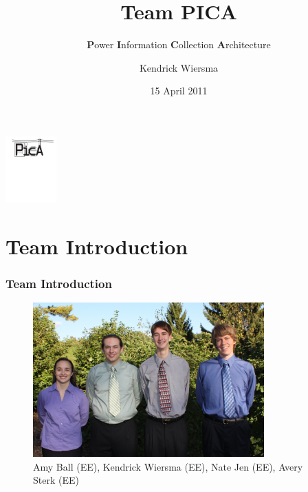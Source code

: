\documentclass{beamer}
\title{Team PICA}
\subtitle{\textbf{P}ower \textbf{I}nformation \textbf{C}ollection \textbf{A}rchitecture}
\author{Kendrick Wiersma}
\institute{Calvin College Engineering Department}
\date{15 April 2011}
\begin{document}
\begin{frame}
\titlepage
\vspace{-0.4in}
\begin{center}
\includegraphics[height=1in]{includes/pica_logo}
\end{center}
\end{frame}
\section[Outline]{}
\begin{frame}
\tableofcontents
\end{frame}
\section{Team Introduction}
\begin{frame}\frametitle{Team Introduction}
\begin{figure}[htbp]
\begin{center}
\includegraphics[width=3.5in]{includes/IMG_0865}
\caption{Amy Ball (EE), Kendrick Wiersma (EE), Nate Jen (EE), Avery Sterk (EE)}
\label{fig:team_pic}
\end{center}
\end{figure}
\end{frame}
\end{document}
